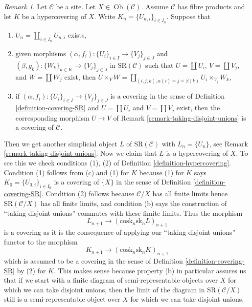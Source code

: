\documentclass{stacks-project}
\theoremstyle{plain}
\theoremstyle{definition}
\theoremstyle{remark}
\newtheorem{remark}[subsection]{Remark}
\numberwithin{equation}{subsection}
\def\Ob{\mathop{\mathrm{Ob}}\nolimits}
\begin{document}
\begin{remark}
\label{remark-take-unions-hypercovering-X}
Let $\mathcal{C}$ be a site. Let $X \in \Ob(\mathcal{C})$.
Assume $\mathcal{C}$ has fibre products and let $K$ be a hypercovering of $X$.
Write $K_n = \{U_{n, i}\}_{i \in I_n}$. Suppose that
\begin{enumerate}
\item[(a)] $U_n = \coprod_{i \in I_n} U_{n, i}$ exists,
\item[(b)] given morphisms
$(\alpha, f_i) : \{U_i\}_{i \in I} \to \{V_j\}_{j \in J}$ and
$(\beta, g_k) : \{W_k\}_{k \in K} \to \{V_j\}_{j \in J}$
in $\text{SR}(\mathcal{C})$ such that
$U = \coprod U_i$, $V = \coprod V_j$, and $W = \coprod W_j$
exist, then $U \times_V W =
\coprod_{(i, j, k), \alpha(i) = j = \beta(k)} U_i \times_{V_j} W_k$,
\item[(c)] if $(\alpha, f_i) : \{U_i\}_{i \in I} \to \{V_j\}_{j \in J}$
is a covering in the sense of
Definition \ref{definition-covering-SR}
and $U = \coprod U_i$ and $V = \coprod V_j$ exist,
then the corresponding morphism $U \to V$
of Remark \ref{remark-taking-disjoint-unions}
is a covering of $\mathcal{C}$.
\end{enumerate}
Then we get another simplicial object $L$ of $\text{SR}(\mathcal{C})$
with $L_n = \{U_n\}$, see
Remark \ref{remark-taking-disjoint-unions}.
Now we claim that $L$ is a hypercovering of $X$.
To see this we check conditions (1), (2) of
Definition \ref{definition-hypercovering}.
Condition (1) follows from (c) and (1) for $K$
because (1) for $K$ says $K_0 = \{U_{0, i}\}_{i \in I_0}$
is a covering of $\{X\}$ in the sense of
Definition \ref{definition-covering-SR}.
Condition (2) follows because $\mathcal{C}/X$ has
all finite limits hence $\text{SR}(\mathcal{C}/X)$
has all finite limits, and condition (b) says the
construction of ``taking disjoint unions'' commutes
with these fimite limits. Thus the morphism
$$
L_{n + 1} \longrightarrow (\text{cosk}_n \text{sk}_n L)_{n + 1}
$$
is a covering as it is the consequence of applying our
``taking disjoint unions'' functor to the morphism
$$
K_{n + 1} \longrightarrow (\text{cosk}_n \text{sk}_n K)_{n + 1}
$$
which is assumed to be a covering in the sense of
Definition \ref{definition-covering-SR} by (2) for $K$.
This makes sense because property (b) in particular assures
us that if we start with a finite diagram of
semi-representable objects over $X$
for which we can take disjoint unions, then
the limit of the diagram in $\text{SR}(\mathcal{C}/X)$
still is a semi-representable object over $X$ for which
we can take disjoint unions.
\end{remark}









\end{document}
